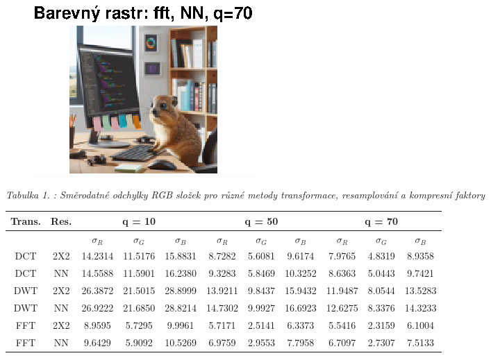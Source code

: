 \begin{figure}[H]
\begin{minipage}[b]{0.3\textwidth}
        \includegraphics[width=\textwidth]{images/barevny_fft_NN_q70.eps}
    \end{minipage}
\end{figure}

\begin{table}[H]
    \centering
    \textit{Tabulka 1. : Směrodatné odchylky RGB složek pro různé metody transformace, resamplování a kompresní faktory}
    
    \begin{tabular}{|c|c|c|c|c|c|c|c|c|c|c|}
    \hline
    \textbf{Trans.} & \textbf{Res.} & \multicolumn{3}{c|}{\textbf{q = 10}} & \multicolumn{3}{c|}{\textbf{q = 50}} & \multicolumn{3}{c|}{\textbf{q = 70}} \\
    \hline
    & & \(\sigma_R\) & \(\sigma_G\) & \(\sigma_B\) & \(\sigma_R\) & \(\sigma_G\) & \(\sigma_B\) & \(\sigma_R\) & \(\sigma_G\) & \(\sigma_B\) \\
    \hline
    DCT & 2X2 & 14.2314 & 11.5176 & 15.8831 & 8.7282 & 5.6081 & 9.6174 & 7.9765 & 4.8319 & 8.9358 \\ \hline
    DCT & NN  & 14.5588 & 11.5901 & 16.2380 & 9.3283 & 5.8469 & 10.3252 & 8.6363 & 5.0443 & 9.7421 \\ \hline
    DWT & 2X2 & 26.3872 & 21.5015 & 28.8999 & 13.9211 & 9.8437 & 15.9432 & 11.9487 & 8.0544 & 13.5283 \\ \hline
    DWT & NN  & 26.9222 & 21.6850 & 28.8214 & 14.7302 & 9.9927 & 16.6923 & 12.6275 & 8.3376 & 14.3233 \\ \hline
    FFT & 2X2 & 8.9595 & 5.7295 & 9.9961 & 5.7171 & 2.5141 & 6.3373 & 5.5416 & 2.3159 & 6.1004 \\ \hline
    FFT & NN  & 9.6429 & 5.9092 & 10.5269 & 6.9759 & 2.9553 & 7.7958 & 6.7097 & 2.7307 & 7.5133 \\ \hline
    \end{tabular}
\end{table}

